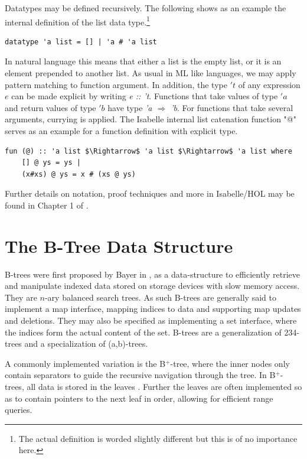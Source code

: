 Datatypes may be defined recursively.
The following shows as an example the internal definition of the list data type.\footnote{
    The actual definition is worded slightly different but this is of no importance here.
}

\begin{lstlisting}[mathescape=true, language=Isabelle,label=lst:list-def]
datatype 'a list = [] | 'a # 'a list
\end{lstlisting}

In natural language this means that either a list is the empty list,
or it is an element prepended to another list.
As usual in ML like languages, we may apply pattern matching to function argument.
In addition, the type $'t$ of any expression $e$ can be
made explicit by writing \textit{e :: 't}.
Functions that take values of type $'a$ and return values of type $'b$ 
have type \textit{'a $\Rightarrow$ 'b}.
For functions that take several arguments,
currying is applied.
The Isabelle internal list catenation function "@" serves as
an example for a function definition with explicit type.

\begin{lstlisting}[mathescape=true, language=Isabelle,label=lst:append-def]
fun (@) :: 'a list $\Rightarrow$ 'a list $\Rightarrow$ 'a list where
    [] @ ys = ys |
    (x#xs) @ ys = x # (xs @ ys)
\end{lstlisting}


Further details on notation, proof techniques and more in Isabelle/HOL
may be found in Chapter 1 of \parencite{DBLP:books/sp/NipkowK14}.


\section{The B-Tree Data Structure}

B-trees were first proposed by Bayer in \parencite{DBLP:journals/acta/BayerM72},
as a data-structure to efficiently retrieve and manipulate
indexed data stored on storage devices with slow memory access.
They are $n$-ary balanced search trees.
As such B-trees are generally said to implement a map interface,
mapping indices to data and supporting map updates and deletions.
They may also be specified as implementing a set interface,
where the indices form the actual content of the set.
B-trees are a generalization of 234-trees and a specialization of (a,b)-trees.

A commonly implemented variation is the B$^+$-tree, where the inner nodes
only contain separators to guide the recursive navigation through the tree.
In B$^+$-trees, all data is stored in the leaves \parencite{DBLP:journals/csur/Comer79}.
Further the leaves are often implemented so as to contain pointers
to the next leaf in order, allowing for efficient range queries.

